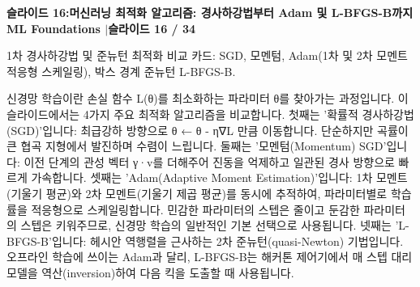 \documentclass[11pt,a4paper]{article}
\begin{document}
\clearpage
\hypertarget{slide.16}{}
{}
\noindent\begin{tcolorbox}[colback=navy,colframe=navy,left=6pt,right=6pt,top=3pt,bottom=3pt,boxrule=0pt,arc=2pt]
{\large\bfseries\color{white}슬라이드 16:\enspace 머신러닝 최적화 알고리즘: 경사하강법부터 Adam 및 L-BFGS-B까지}\hfill{\footnotesize\bfseries\color{white!85!lightbg}ML Foundations \enspace$|$\enspace 슬라이드 16 / 34}
\end{tcolorbox}
\vspace{0.2em}
\begin{tcolorbox}[colback=lightbg,colframe=bordergray,title={\footnotesize\bfseries\color{darkgray}슬라이드 시각 구성 요약},fontupper=\small,left=6pt,right=6pt,top=2.5pt,bottom=2.5pt,boxrule=0.6pt,arc=2.5pt]
1차 경사하강법 및 준뉴턴 최적화 비교 카드: SGD, 모멘텀, Adam(1차 및 2차 모멘트 적응형 스케일링), 박스 경계 준뉴턴 L-BFGS-B.
\end{tcolorbox}
\vspace{0.2em}
\begin{tcolorbox}[colback=white,colframe=primaryblue,title={\footnotesize\bfseries\color{white}발표자 구두 대본 (Spoken Script)},fontupper=\small,left=6pt,right=6pt,top=3pt,bottom=3pt,boxrule=0.8pt,arc=2.5pt]
신경망 학습이란 손실 함수 L(θ)를 최소화하는 파라미터 θ를 찾아가는 과정입니다. 이 슬라이드에서는 4가지 주요 최적화 알고리즘을 비교합니다. 첫째는 '확률적 경사하강법(SGD)'입니다: 최급강하 방향으로 θ ← θ - η∇L 만큼 이동합니다. 단순하지만 곡률이 큰 협곡 지형에서 발진하며 수렴이 느립니다. 둘째는 '모멘텀(Momentum) SGD'입니다: 이전 단계의 관성 벡터 γ·v를 더해주어 진동을 억제하고 일관된 경사 방향으로 빠르게 가속합니다. 셋째는 'Adam(Adaptive Moment Estimation)'입니다: 1차 모멘트(기울기 평균)와 2차 모멘트(기울기 제곱 평균)를 동시에 추적하여, 파라미터별로 학습률을 적응형으로 스케일링합니다. 민감한 파라미터의 스텝은 줄이고 둔감한 파라미터의 스텝은 키워주므로, 신경망 학습의 일반적인 기본 선택으로 사용됩니다. 넷째는 'L-BFGS-B'입니다: 헤시안 역행렬을 근사하는 2차 준뉴턴(quasi-Newton) 기법입니다. 오프라인 학습에 쓰이는 Adam과 달리, L-BFGS-B는 해커톤 제어기에서 매 스텝 대리 모델을 역산(inversion)하여 다음 킥을 도출할 때 사용됩니다.
\end{tcolorbox}
\vspace{0.2em}
\end{document}
